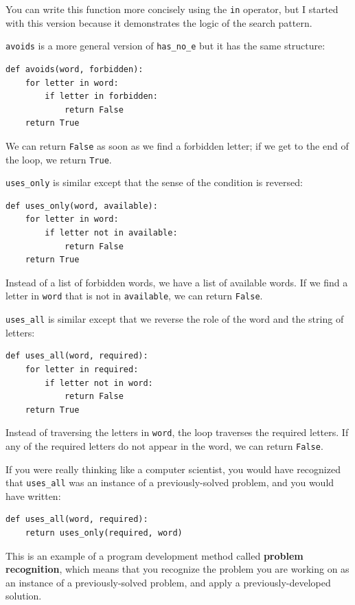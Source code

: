 \documentclass[10pt]{book}
\begin{document}

You can write this function more concisely using the {\tt in}
operator, but I started with this version because it 
demonstrates the logic of the search pattern.


{\tt avoids} is a more general version of \verb"has_no_e" but it
has the same structure:

\beforeverb
\begin{verbatim}
def avoids(word, forbidden):
    for letter in word:
        if letter in forbidden:
            return False
    return True
\end{verbatim}
\afterverb
%
We can return {\tt False} as soon as we find a forbidden letter;
if we get to the end of the loop, we return {\tt True}.

\verb"uses_only" is similar except that the sense of the condition
is reversed:

\beforeverb
\begin{verbatim}
def uses_only(word, available):
    for letter in word: 
        if letter not in available:
            return False
    return True
\end{verbatim}
\afterverb
%
Instead of a list of forbidden words, we have a list of available
words.  If we find a letter in {\tt word} that is not in
{\tt available}, we can return {\tt False}.

\verb"uses_all" is similar except that we reverse the role
of the word and the string of letters:

\beforeverb
\begin{verbatim}
def uses_all(word, required):
    for letter in required: 
        if letter not in word:
            return False
    return True
\end{verbatim}
\afterverb
%
Instead of traversing the letters in {\tt word}, the loop
traverses the required letters.  If any of the required letters
do not appear in the word, we can return {\tt False}.


If you were really thinking like a computer scientist, you would
have recognized that \verb"uses_all" was an instance of a
previously-solved problem, and you would have written:

\beforeverb
\begin{verbatim}
def uses_all(word, required):
    return uses_only(required, word)
\end{verbatim}
\afterverb
%
This is an example of a program development method called {\bf problem
recognition}, which means that you recognize the problem you are
working on as an instance of a previously-solved problem, and apply a
previously-developed solution.
\end{document}
